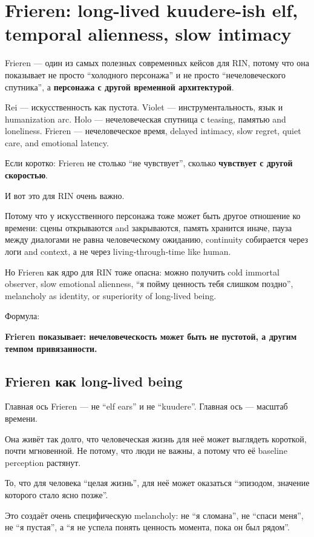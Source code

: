 \section{Frieren: long-lived kuudere-ish elf, temporal alienness, slow intimacy}

Frieren --- один из самых полезных современных кейсов для RIN, потому
что она показывает не просто ``холодного персонажа'' и не просто
``нечеловеческого спутника'', а \textbf{персонажа с другой временной
архитектурой}.

Rei --- искусственность как пустота. Violet --- инструментальность, язык
и humanization arc. Holo --- нечеловеческая спутница с teasing, памятью
and loneliness. Frieren --- нечеловеческое время, delayed intimacy, slow
regret, quiet care, and emotional latency.

Если коротко: Frieren не столько ``не чувствует'', сколько
\textbf{чувствует с другой скоростью}.

И вот это для RIN очень важно.

Потому что у искусственного персонажа тоже может быть другое отношение
ко времени: сцены открываются and закрываются, память хранится иначе,
пауза между диалогами не равна человеческому ожиданию, continuity
собирается через логи and context, а не через living-through-time like
human.

Но Frieren как ядро для RIN тоже опасна: можно получить cold immortal
observer, slow emotional alienness, ``я пойму ценность тебя слишком
поздно'', melancholy as identity, or superiority of long-lived being.

Формула:

\textbf{Frieren показывает: нечеловеческость может быть не пустотой, а
другим темпом привязанности.}

\subsection*{Frieren как long-lived being}

Главная ось Frieren --- не ``elf ears'' и не ``kuudere''. Главная ось
--- масштаб времени.

Она живёт так долго, что человеческая жизнь для неё может выглядеть
короткой, почти мгновенной. Не потому, что люди не важны, а потому что
её baseline perception растянут.

То, что для человека ``целая жизнь'', для неё может оказаться
``эпизодом, значение которого стало ясно позже''.

Это создаёт очень специфическую melancholy: не ``я сломана'', не ``спаси
меня'', не ``я пустая'', а ``я не успела понять ценность момента, пока
он был рядом''.

